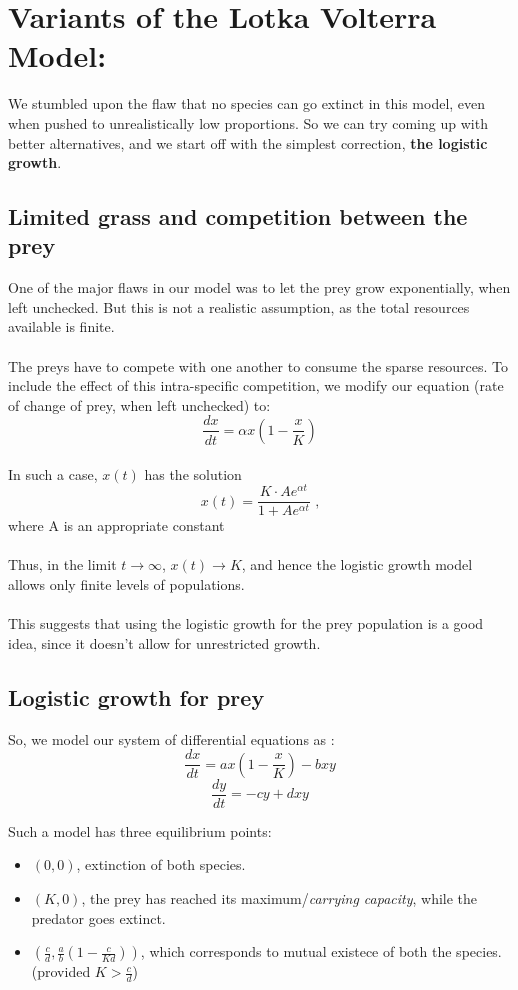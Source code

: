 \documentclass{article}
\begin{document}
\section{Variants of the Lotka Volterra Model:}

We stumbled upon the flaw that no species can go extinct in this model, even when pushed to unrealistically low proportions. So we can try coming up with better alternatives, and we start off with the simplest correction, \textbf{the logistic growth}.

\subsection{Limited grass and competition between the prey}
One of the major flaws in our model was to let the prey grow exponentially, when left unchecked. But this is not a realistic assumption, as the total resources available is finite.
\\
\\
The preys have to compete with one another to consume the sparse resources. To include the effect of this intra-specific competition, we modify our equation (rate of change of prey, when left unchecked) to:
$$\frac{dx}{dt} = \alpha x \left (1 - \frac{x}{K}\right )$$
\\
In such a case, $x(t)$ has the solution $$x(t) = \frac{K\cdot Ae^{\alpha t}}{1 + A e^{\alpha t}} \text{ ,}$$
 where A is an appropriate constant
\\
\\
Thus, in the limit $t \to \infty$, $x(t) \to K$, and hence the logistic growth model allows only finite levels of populations. 
\\
\\
This suggests that using the logistic growth for the prey population is a good idea, since it doesn't allow for unrestricted growth.

\subsection{Logistic growth for prey}
So, we model our system of differential equations as :
$$\frac{dx}{dt} = ax\left(1 - \frac{x}{K}\right) - bxy$$
$$\frac{dy}{dt} = -cy + dxy$$

Such a model has three equilibrium points:
\begin{itemize}
    \item $(0, 0)$, extinction of both species.
    \item $(K, 0)$, the prey has reached its maximum/\emph{carrying capacity}, while the predator goes extinct.
    \item $\left(\frac{c}{d}, \frac{a}{b} \left(1 - \frac{c}{Kd} \right) \right)$, which corresponds to mutual existece of both the species. (provided $K > \frac{c}{d}$) 
\end{itemize}
\end{document}
